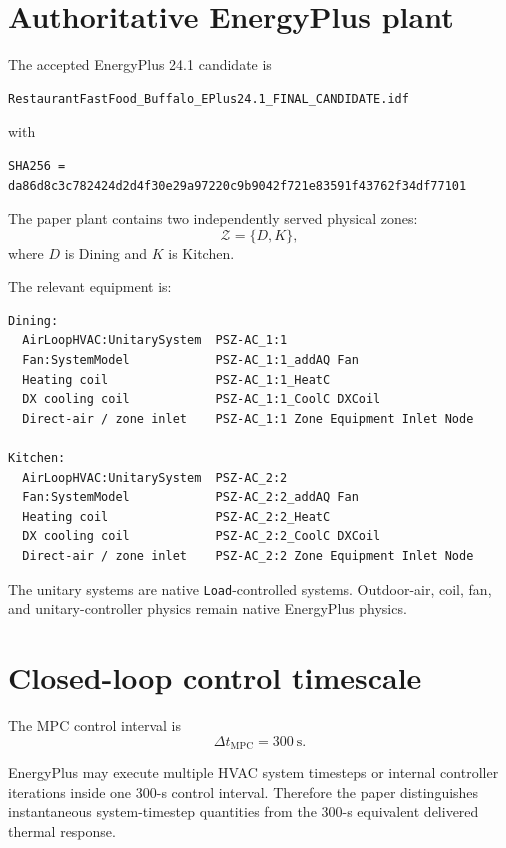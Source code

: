 \documentclass[11pt]{article}
\begin{document}
\section{Authoritative EnergyPlus plant}

The accepted EnergyPlus 24.1 candidate is
\begin{verbatim}
RestaurantFastFood_Buffalo_EPlus24.1_FINAL_CANDIDATE.idf
\end{verbatim}
with
\begin{verbatim}
SHA256 =
da86d8c3c782424d2d4f30e29a97220c9b9042f721e83591f43762f34df77101
\end{verbatim}

The paper plant contains two independently served physical zones:
\begin{equation}
\mathcal Z=\{D,K\},
\end{equation}
where $D$ is Dining and $K$ is Kitchen.

The relevant equipment is:
\begin{verbatim}
Dining:
  AirLoopHVAC:UnitarySystem  PSZ-AC_1:1
  Fan:SystemModel            PSZ-AC_1:1_addAQ Fan
  Heating coil               PSZ-AC_1:1_HeatC
  DX cooling coil            PSZ-AC_1:1_CoolC DXCoil
  Direct-air / zone inlet    PSZ-AC_1:1 Zone Equipment Inlet Node

Kitchen:
  AirLoopHVAC:UnitarySystem  PSZ-AC_2:2
  Fan:SystemModel            PSZ-AC_2:2_addAQ Fan
  Heating coil               PSZ-AC_2:2_HeatC
  DX cooling coil            PSZ-AC_2:2_CoolC DXCoil
  Direct-air / zone inlet    PSZ-AC_2:2 Zone Equipment Inlet Node
\end{verbatim}

The unitary systems are native \texttt{Load}-controlled systems.  Outdoor-air,
coil, fan, and unitary-controller physics remain native EnergyPlus physics.

\section{Closed-loop control timescale}

The MPC control interval is
\begin{equation}
\boxed{\Delta t_{\mathrm{MPC}}=300~\mathrm{s}.}
\end{equation}

EnergyPlus may execute multiple HVAC system timesteps or internal controller
iterations inside one 300-s control interval.  Therefore the paper distinguishes
instantaneous system-timestep quantities from the 300-s equivalent delivered
thermal response.
\end{document}
